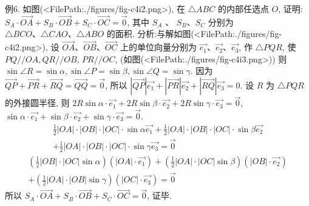 例6. 如图(<FilePath:./figures/fig-c4i2.png>), 在 $\triangle A B C$ 的内部任选点 $O$, 证明: $S_A \cdot \overrightarrow{O A}+S_B \cdot \overrightarrow{O B}+S_C \cdot \overrightarrow{O C}=\overrightarrow{0}$, 其中 $S_A$ 、 $S_B 、 S_C$ 分别为 $\triangle B C O 、 \triangle C A O 、 \triangle A B O$ 的面积.
分析:与解如图(<FilePath:./figures/fig-c4i2.png>), 设 $\overrightarrow{O A} 、 \overrightarrow{O B} 、 \overrightarrow{O C}$ 上的单位向量分别为 $\overrightarrow{e_1} 、 \overrightarrow{e_2} 、 \overrightarrow{e_3}$, 作 $\triangle P Q R$, 使 $P Q / / O A, Q R / / O B$, $P R / / O C$, (如图(<FilePath:./figures/fig-c4i3.png>)) 则 $\sin \angle R=\sin \alpha, \sin \angle P= \sin \beta, \sin \angle Q=\sin \gamma$.
因为 $\overrightarrow{Q P}+\overrightarrow{P R}+\overrightarrow{R Q}=\overrightarrow{Q Q}=\overrightarrow{0}$, 所以 $|\overrightarrow{Q P}| \overrightarrow{e_1}+ |\overrightarrow{P R}| \overrightarrow{e_2}+|\overrightarrow{R Q}| \overrightarrow{e_3}=0$.
设 $R$ 为 $\triangle P Q R$ 的外接圆半径, 则
$2 R \sin \alpha \cdot \overrightarrow{e_1}+2 R \sin \beta \cdot \overrightarrow{e_2}+2 R \sin \gamma \cdot \overrightarrow{e_3}=\overrightarrow{0}$, $\sin \alpha \cdot \overrightarrow{e_1}+\sin \beta \cdot \overrightarrow{e_2}+\sin \gamma \cdot \overrightarrow{e_3}=\overrightarrow{0}$.
$$
\begin{gathered}
\frac{1}{2}|O A| \cdot|O B| \cdot|O C| \cdot \sin \alpha \overrightarrow{e_1}+\frac{1}{2}|O A| \cdot|O B| \cdot|O C| \cdot \sin \beta \overrightarrow{e_2} \\
+\frac{1}{2}|O A| \cdot|O B| \cdot|O C| \cdot \sin \gamma \overrightarrow{e_3}=\overrightarrow{0}
\end{gathered}
$$
$$
\begin{gathered}
\left(\frac{1}{2}|O B| \cdot|O C| \sin \alpha\right)\left(|O A| \cdot \overrightarrow{e_1}\right)+\left(\frac{1}{2}|O A| \cdot|O C| \sin \beta\right)\left(|O B| \cdot \overrightarrow{e_2}\right) \\
+\left(\frac{1}{2}|O A| \cdot|O B| \sin \gamma\right)\left(|O C| \cdot \overrightarrow{e_3}\right)=\overrightarrow{0}
\end{gathered}
$$
所以 $S_A \cdot \overrightarrow{O A}+S_B \cdot \overrightarrow{O B}+S_C \cdot \overrightarrow{O C}=\overrightarrow{0}$, 证毕.



